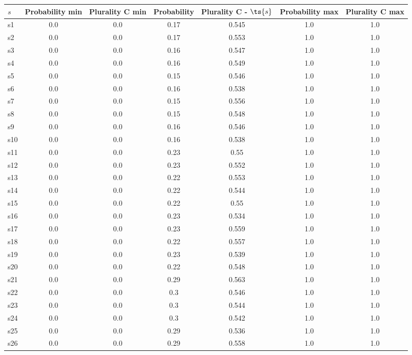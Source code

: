 \documentclass{article}
\begin{document}
\noindent\begin{tabular}{|l|c|c|c|c|c|c|}
\hline
$s$& Probability min & Plurality C min & Probability & Plurality C - $\ts{s}$ & Probability max & Plurality C max\\
\hline
s1 &0.0 & 0.0 & 0.17 & 0.545 & 1.0 & 1.0\\
\hline
s2 &0.0 & 0.0 & 0.17 & 0.553 & 1.0 & 1.0\\
\hline
s3 &0.0 & 0.0 & 0.16 & 0.547 & 1.0 & 1.0\\
\hline
s4 &0.0 & 0.0 & 0.16 & 0.549 & 1.0 & 1.0\\
\hline
s5 &0.0 & 0.0 & 0.15 & 0.546 & 1.0 & 1.0\\
\hline
s6 &0.0 & 0.0 & 0.16 & 0.538 & 1.0 & 1.0\\
\hline
s7 &0.0 & 0.0 & 0.15 & 0.556 & 1.0 & 1.0\\
\hline
s8 &0.0 & 0.0 & 0.15 & 0.548 & 1.0 & 1.0\\
\hline
s9 &0.0 & 0.0 & 0.16 & 0.546 & 1.0 & 1.0\\
\hline
s10 &0.0 & 0.0 & 0.16 & 0.538 & 1.0 & 1.0\\
\hline
s11 &0.0 & 0.0 & 0.23 & 0.55 & 1.0 & 1.0\\
\hline
s12 &0.0 & 0.0 & 0.23 & 0.552 & 1.0 & 1.0\\
\hline
s13 &0.0 & 0.0 & 0.22 & 0.553 & 1.0 & 1.0\\
\hline
s14 &0.0 & 0.0 & 0.22 & 0.544 & 1.0 & 1.0\\
\hline
s15 &0.0 & 0.0 & 0.22 & 0.55 & 1.0 & 1.0\\
\hline
s16 &0.0 & 0.0 & 0.23 & 0.534 & 1.0 & 1.0\\
\hline
s17 &0.0 & 0.0 & 0.23 & 0.559 & 1.0 & 1.0\\
\hline
s18 &0.0 & 0.0 & 0.22 & 0.557 & 1.0 & 1.0\\
\hline
s19 &0.0 & 0.0 & 0.23 & 0.539 & 1.0 & 1.0\\
\hline
s20 &0.0 & 0.0 & 0.22 & 0.548 & 1.0 & 1.0\\
\hline
s21 &0.0 & 0.0 & 0.29 & 0.563 & 1.0 & 1.0\\
\hline
s22 &0.0 & 0.0 & 0.3 & 0.546 & 1.0 & 1.0\\
\hline
s23 &0.0 & 0.0 & 0.3 & 0.544 & 1.0 & 1.0\\
\hline
s24 &0.0 & 0.0 & 0.3 & 0.542 & 1.0 & 1.0\\
\hline
s25 &0.0 & 0.0 & 0.29 & 0.536 & 1.0 & 1.0\\
\hline
s26 &0.0 & 0.0 & 0.29 & 0.558 & 1.0 & 1.0\\
\hline

\end{tabular}
\end{document}
